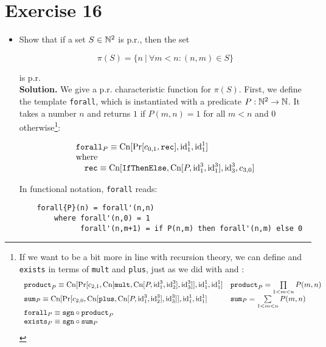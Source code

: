 \section{Exercise 16}

\begin{itemize}
	\item Show that if a set $S \in \mathbb{N}^2$ is p.r., then the set
	
	$$
		\pi(S) = \{n\ |\ \forall m < n: (n,m) \in S  \}
	$$
	
	is p.r.\\
	
	\textbf{Solution.} We give a p.r. characteristic function for $\pi(S)$. First, we define the template \texttt{forall}, which is instantiated with a predicate $P : \mathbb{N}^2 \rightarrow \mathbb{N}$. It takes a number $n$ and returns $1$ if $P(m,n) = 1$ for all $m < n$ and 0 otherwise\footnote{If we want to be a bit more in line with recursion theory, we can define  and \texttt{exists} in terms of \texttt{mult} and \texttt{plus}, just as we did with  and : $$
		\begin{array}{l l}
			\texttt{product}_P \equiv \textnormal{Cn}[\textnormal{Pr}[c_{2,1},\textnormal{Cn}[\texttt{mult}, \textnormal{Cn}[P, \textnormal{id}^3_1, \textnormal{id}^3_2], \textnormal{id}^3_3] ], \textnormal{id}^1_1, \textnormal{id}^1_1] &
				\texttt{product}_P = \prod\limits_{1<m<n} P(m,n)\\
			\texttt{sum}_P \equiv \textnormal{Cn}[\textnormal{Pr}[c_{2,0},\textnormal{Cn}[\texttt{plus}, \textnormal{Cn}[P, \textnormal{id}^3_1, \textnormal{id}^3_2], \textnormal{id}^3_3] ], \textnormal{id}^1_1, \textnormal{id}^1_1] &
							\texttt{sum}_P = \sum\limits_{1<m<n} P(m,n)\\
			\texttt{forall}_P \equiv \texttt{sgn} \circ \texttt{product}_P\\
			\texttt{exists}_P \equiv \texttt{sgn} \circ \texttt{sum}_P\\
		\end{array}
	$$}:
	
	$$
		\begin{array}{l}
			\texttt{forall}_P \equiv \textnormal{Cn}[\textnormal{Pr}[c_{0,1}, \texttt{rec}], \textnormal{id}^1_1, \textnormal{id}^1_1] \\
			\textnormal{where}\\
			\quad \texttt{rec} \equiv \textnormal{Cn}[\texttt{IfThenElse}, \textnormal{Cn}[P, \textnormal{id}^3_1, \textnormal{id}^3_1], \textnormal{id}^3_3, c_{3,0}]
		\end{array}
	$$
	
	In functional notation, \texttt{forall} reads:
	
	\begin{verbatim}
	forall{P}(n) = forall'(n,n)
		where forall'(n,0) = 1
		      forall'(n,m+1) = if P(n,m) then forall'(n,m) else 0
	\end{verbatim}
	

\end{itemize}
